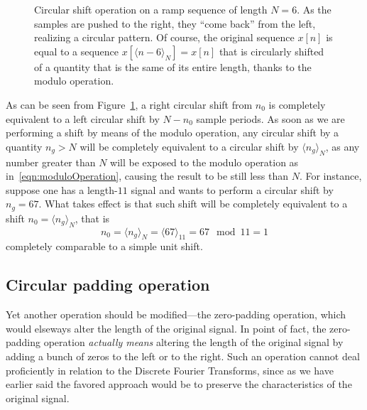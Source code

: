 \documentclass[\documentfontsize, twocolumn]{\classname}
\begin{document}
\begin{figure}[ht]
\begin{center}
\end{center}\caption{Circular shift operation on a ramp sequence of length $N = 6$. As the samples are pushed to the right, they ``come back'' from the left, realizing a circular pattern. Of course, the original sequence $x[n]$ is equal to a sequence $x[\langle n - 6\rangle_N] = x[n]$ that is circularly shifted of a quantity that is the same of its entire length, thanks to the modulo operation.}\label{tikz:circularShift}
\end{figure}

As can be seen from Figure~\ref{tikz:circularShift}, a right circular shift from $n_0$ is completely equivalent to a left circular shift by $N-n_0$ sample periods. As soon as we are performing a shift by means of the modulo operation, any circular shift by a quantity $n_g > N$ will be completely equivalent to a circular shift by $\langle n_g \rangle_N$, as any number greater than $N$ will be exposed to the modulo operation as in~\ref{eqn:moduloOperation}, causing the result to be still less than $N$. For instance, suppose one has a length-$11$ signal and wants to perform a circular shift by $n_g = 67$. What takes effect is that such shift will be completely equivalent to a shift $n_0 = \langle n_g \rangle_N$, that is
\[
    n_0 = \langle n_g \rangle_N = \langle 67 \rangle_{11} = 67 \mod 11 = 1
\]
completely comparable to a simple unit shift.

\subsection{Circular padding operation}
Yet another operation should be modified---the zero-padding operation, which would elseways alter the length of the original signal. In point of fact, the zero-padding operation \emph{actually means} altering the length of the original signal by adding a bunch of zeros to the left or to the right. Such an operation cannot deal proficiently in relation to the Discrete Fourier Transforms, since as we have earlier said the favored approach would be to preserve the characteristics of the original signal.
\end{document}
